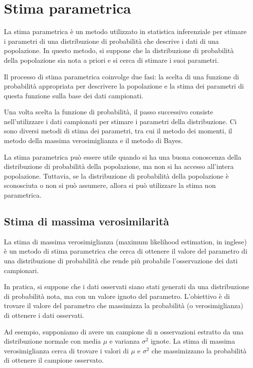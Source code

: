 \chapter{Stima parametrica}
La stima parametrica è un metodo utilizzato in statistica inferenziale per stimare i parametri di una distribuzione di probabilità che descrive i dati di una popolazione. In questo metodo, si suppone che la distribuzione di probabilità della popolazione sia nota a priori e si cerca di stimare i suoi parametri. 

Il processo di stima parametrica coinvolge due fasi: la scelta di una funzione di probabilità appropriata per descrivere la popolazione e la stima dei parametri di questa funzione sulla base dei dati campionati.

Una volta scelta la funzione di probabilità, il passo successivo consiste nell'utilizzare i dati campionati per stimare i parametri della distribuzione. Ci sono diversi metodi di stima dei parametri, tra cui il metodo dei momenti, il metodo della massima verosimiglianza e il metodo di Bayes.

La stima parametrica può essere utile quando si ha una buona conoscenza della distribuzione di probabilità della popolazione, ma non si ha accesso all'intera popolazione. Tuttavia, se la distribuzione di probabilità della popolazione è sconosciuta o non si può assumere, allora si può utilizzare la stima non parametrica.

\section{Stima di massima verosimilarità}
La stima di massima verosimiglianza (maximum likelihood estimation, in inglese) è un metodo di stima parametrica che cerca di ottenere il valore del parametro di una distribuzione di probabilità che rende più probabile l'osservazione dei dati campionari.

In pratica, si suppone che i dati osservati siano stati generati da una distribuzione di probabilità nota, ma con un valore ignoto del parametro. L'obiettivo è di trovare il valore del parametro che massimizza la probabilità (o verosimiglianza) di ottenere i dati osservati.

Ad esempio, supponiamo di avere un campione di n osservazioni estratto da una distribuzione normale con media $\mu$ e varianza $\sigma^2$ ignote. La stima di massima verosimiglianza cerca di trovare i valori di $\mu$ e $\sigma^2$ che massimizzano la probabilità di ottenere il campione osservato.

